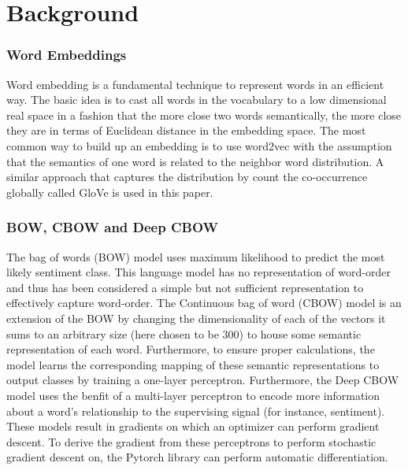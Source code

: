 \section{Background}
\label{sec: background}

\subsubsection{Word Embeddings}
Word embedding is a fundamental technique to represent words in an efficient
way. The basic idea is to cast all words in the vocabulary to a low dimensional
real space in a fashion that the more close two words semantically, the more
close they are in terms of Euclidean distance in the embedding space. The most
common way to build up an embedding is to use
word2vec\cite{mikolov2013distributed} with the assumption that the semantics of
one word is related to the neighbor word distribution. A similar approach that
captures the distribution by count the co-occurrence globally called
GloVe\cite{pennington2014glove} is used in this paper.

\subsubsection{BOW, CBOW and Deep CBOW}
The bag of words (BOW) model uses maximum likelihood to predict the most likely
sentiment class. This language model has no representation of word-order and
thus has been considered a simple but not sufficient representation to
effectively capture word-order. The Continuous bag of word (CBOW)
model\cite{DBLP:journals/corr/abs-1301-3781} is an extension of the BOW by
changing the dimensionality of each of the vectors it sums to an arbitrary size
(here chosen to be 300) to house some semantic representation of each word.
Furthermore, to ensure proper calculations, the model learns the corresponding
mapping of these semantic representations to output classes by training a
one-layer perceptron. Furthermore, the Deep CBOW model uses the benfit of a
multi-layer perceptron to encode more information about a word's relationship to
the supervising signal (for instance, sentiment). These models result in
gradients on which an optimizer can perform gradient descent. To derive the
gradient from these perceptrons to perform stochastic gradient descent on, the
Pytorch library can perform automatic differentiation\cite{paszke2017automatic}.

